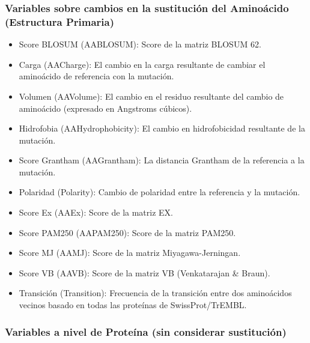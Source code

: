 \subsubsection{Variables sobre cambios en la sustitución del Aminoácido (Estructura Primaria)}
\begin{itemize}
    \item Score BLOSUM (AABLOSUM): Score de la matriz BLOSUM 62.
    \item Carga (AACharge): El cambio en la carga resultante de cambiar el aminoácido de referencia con la mutación.
    \item Volumen (AAVolume): El cambio en el residuo resultante del cambio de aminoácido (expresado en Angstroms cúbicos).
    \item Hidrofobia (AAHydrophobicity): El cambio en hidrofobicidad resultante de la mutación.
    \item Score Grantham (AAGrantham): La distancia Grantham de la referencia a la mutación.
    \item Polaridad (Polarity): Cambio de polaridad entre la referencia y la mutación.
    \item Score Ex (AAEx): Score de la matriz EX.
    \item Score PAM250 (AAPAM250): Score de la matriz PAM250.
    \item Score MJ (AAMJ): Score de la matriz Miyagawa-Jerningan.
    \item Score VB (AAVB): Score de la matriz VB (Venkatarajan \& Braun).
    \item Transición (Transition): Frecuencia de la transición entre dos aminoácidos vecinos basado en todas las proteínas de SwissProt/TrEMBL.
\end{itemize}

\subsubsection{Variables a nivel de Proteína (sin considerar sustitución)}

